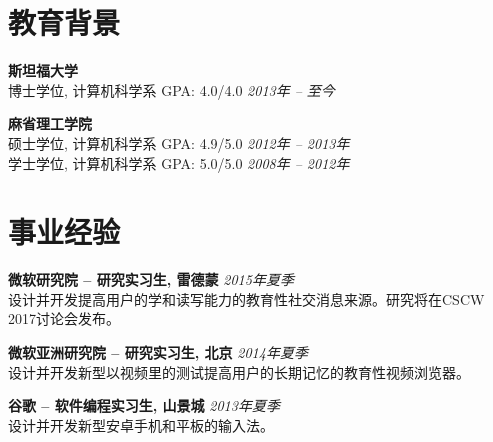 \documentclass[margin,line]{resume}
\begin{document}
\vspace{-5.0mm}

\begin{resume}

\section{\mysidestyle 教育背景}

\textbf{斯坦福大学} \vspace{0mm}\\\vspace{0mm}%
博士学位, 计算机科学系  \hspace{4.5mm} GPA: 4.0/4.0 \hspace{5mm} \hfill \textsl{2013年 -- 至今}

\textbf{麻省理工学院} \vspace{0mm}\\\vspace{0mm}%
硕士学位, 计算机科学系 \hspace{4.5mm} GPA: 4.9/5.0 \hspace{10mm} \hfill \textsl{2012年 -- 2013年}\\\vspace{1mm}%
学士学位, 计算机科学系 \hspace{4.5mm} GPA: 5.0/5.0 \hfill \textsl{2008年 -- 2012年}\vspace{-0.8mm}

\section{\mysidestyle 事业经验}

\textbf{微软研究院 -- 研究实习生, 雷德蒙} \hspace{13.5mm} \hfill \textsl{2015年夏季}\\
设计并开发提高用户的学和读写能力的教育性社交消息来源。研究将在CSCW 2017讨论会发布。

\textbf{微软亚洲研究院 -- 研究实习生, 北京} \hspace{17.5mm} \hfill \textsl{2014年夏季}\\
设计并开发新型以视频里的测试提高用户的长期记忆的教育性视频浏览器。

\textbf{谷歌 -- 软件编程实习生, 山景城} \hspace{5mm} \hfill \textsl{2013年夏季}\\
设计并开发新型安卓手机和平板的输入法。


\end{resume}
\end{document}
